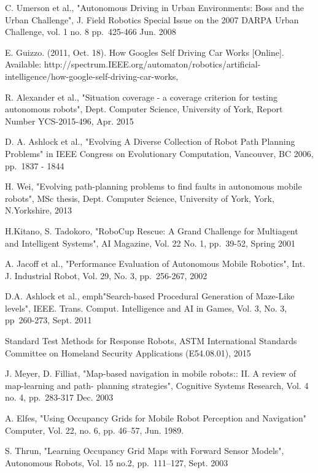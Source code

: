 \documentclass[authoryearcitations]{UoYCSproject}
\begin{document}
\begin{thebibliography}{56}
	C. Umerson et al.,
	"Autonomous Driving in Urban Environments: Boss and the Urban Challenge",
	J. Field Robotics Special Issue on the 2007 DARPA Urban Challenge,
	vol. 1 no. 8 pp.~425-466
	Jun. 2008
	
	E. Guizzo.
	(2011, Oct. 18).
	How Googles Self Driving Car Works [Online].
	Available: http://spectrum.IEEE.org/automaton/robotics/artificial-intelligence/how-google-self-driving-car-works, 
	
	R. Alexander et al.,
	"Situation coverage - a coverage criterion for testing autonomous robots",
	Dept. Computer Science, University of York,
	Report Number YCS-2015-496,
	Apr. 2015
	
	D. A. Ashlock et al.,
	"Evolving A Diverse Collection of Robot Path Planning Problems" in
	IEEE Congress on Evolutionary Computation,
	Vancouver, BC
    2006, pp.~1837 - 1844 

	H. Wei,
	"Evolving path-planning problems to find faults in autonomous mobile robots",
	MSc thesis,
	Dept. Computer Science, University of York, York, N.Yorkshire, 2013

	H.Kitano, S. Tadokoro,
	"RoboCup Rescue: A Grand Challenge for Multiagent and Intelligent Systems",
	AI Magazine,
	Vol. 22 No. 1, pp.~39-52,
	Spring 2001

	A. Jacoff et al.,
	"Performance Evaluation of Autonomous Mobile Robotics",
	Int. J. Industrial Robot,
	Vol. 29, No. 3, pp.~256-267,
	2002

	D.A. Ashlock et al.,
	emph{"Search-based Procedural Generation of Maze-Like levels"},
	IEEE. Trans. Comput. Intelligence and AI in Games,
	Vol. 3, No. 3, pp~260-273,
	Sept. 2011
	
	Standard Test Methods for Response Robots, 
	ASTM International Standards Committee on Homeland Security Applications (E54.08.01),
	2015
	
	J. Meyer, D. Filliat,
	"Map-based navigation in mobile robots:: II. A review of map-learning and path-	planning strategies",
	Cognitive Systems Research,
	Vol. 4 no. 4, pp.~283-317
	Dec. 2003
	
	A. Elfes,
	"Using Occupancy Grids for Mobile Robot Perception and Navigation"
	Computer, 
	Vol. 22, no. 6, pp. 46–57, 
	Jun. 1989.
	
	S. Thrun,
	"Learning Occupancy Grid Maps with Forward Sensor Models",
	Autonomous Robots,
	Vol. 15 no.2, pp.~111–127,
	Sept. 2003
	

\end{thebibliography}
\end{document}
